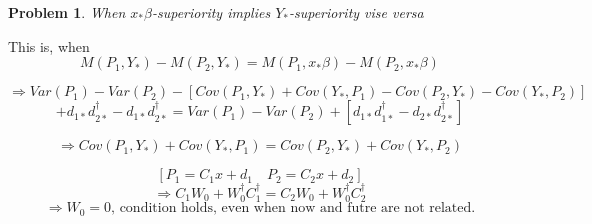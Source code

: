 \documentclass{article}
\newtheorem{problem}[theorem]{Problem}
\begin{document}
\setcounter{part}{5} \setcounter{page}{28}

\begin{problem}
When $x_{\ast }\beta $-superiority implies $Y_{\ast }$-superiority vise versa
\end{problem}

This is, when%
\begin{equation*}
M\left( P_{1},Y_{\ast }\right) -M\left( P_{2},Y_{\ast }\right) =M\left(
P_{1},x_{\ast }\beta \right) -M\left( P_{2},x_{\ast }\beta \right)
\end{equation*}

\begin{equation*}
\Rightarrow Var\left( P_{1}\right) -Var\left( P_{2}\right) -\left[ Cov\left(
P_{1},Y_{\ast }\right) +Cov\left( Y_{\ast },P_{1}\right) -Cov\left(
P_{2},Y_{\ast }\right) -Cov\left( Y_{\ast },P_{2}\right) \right]
\end{equation*}%
\begin{equation*}
+d_{1\ast }d_{2\ast }^{\dagger }-d_{1\ast }d_{2\ast }^{\dagger }=Var\left(
P_{1}\right) -Var\left( P_{2}\right) +\left[ d_{1\ast }d_{1\ast }^{\dagger
}-d_{2\ast }d_{2\ast }^{\dagger }\right]
\end{equation*}

\begin{equation*}
\Rightarrow Cov\left( P_{1},Y_{\ast }\right) +Cov\left( Y_{\ast
},P_{1}\right) =Cov\left( P_{2},Y_{\ast }\right) +Cov\left( Y_{\ast
},P_{2}\right)
\end{equation*}

\begin{equation*}
\left[ P_{1}=C_{1}x+d_{1}\quad P_{2}=C_{2}x+d_{2}\right]
\end{equation*}%
\begin{equation*}
\Rightarrow C_{1}W_{0}+W_{0}^{\dagger }C_{1}^{\dagger
}=C_{2}W_{0}+W_{0}^{\dagger }C_{2}^{\dagger }
\end{equation*}%
\begin{equation*}
\Rightarrow W_{0}=0\text{, condition holds, even when now and futre are not
related.}
\end{equation*}

\bigskip
\end{document}
